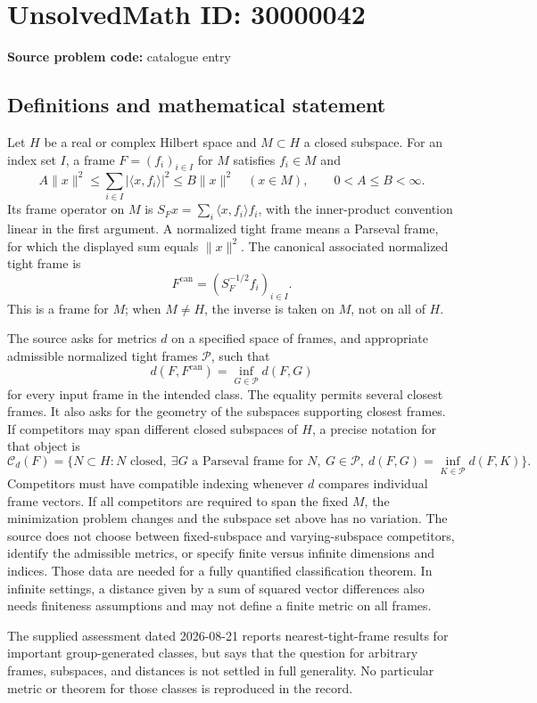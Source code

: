 \documentclass[11pt]{article}
\begin{document}
\section*{UnsolvedMath ID: 30000042}
\textbf{Source problem code:} catalogue entry
\subsection{Definitions and mathematical statement}
Let \(H\) be a real or complex Hilbert space and \(M\subset H\) a closed subspace. For an index set \(I\), a frame \(F=(f_i)_{i\in I}\) for \(M\) satisfies \(f_i\in M\) and
\[
A\|x\|^2\leq\sum_{i\in I}|\langle x,f_i\rangle|^2\leq B\|x\|^2
\quad(x\in M),\qquad 0<A\leq B<\infty.
\]
Its frame operator on \(M\) is \(S_Fx=\sum_i\langle x,f_i\rangle f_i\), with the inner-product convention linear in the first argument. A normalized tight frame means a Parseval frame, for which the displayed sum equals \(\|x\|^2\). The canonical associated normalized tight frame is
\[
F^{\mathrm{can}}=(S_F^{-1/2}f_i)_{i\in I}.
\]
This is a frame for \(M\); when \(M\ne H\), the inverse is taken on \(M\), not on all of \(H\).

The source asks for metrics \(d\) on a specified space of frames, and appropriate admissible normalized tight frames \(\mathcal P\), such that
\[
d(F,F^{\mathrm{can}})=\inf_{G\in\mathcal P}d(F,G)
\]
for every input frame in the intended class. The equality permits several closest frames. It also asks for the geometry of the subspaces supporting closest frames. If competitors may span different closed subspaces of \(H\), a precise notation for that object is
\[
\mathcal C_d(F)=\{N\subset H:N\text{ closed},\ \exists G\text{ a Parseval frame for }N,
\ G\in\mathcal P,\ d(F,G)=\inf_{K\in\mathcal P}d(F,K)\}.
\]
Competitors must have compatible indexing whenever \(d\) compares individual frame vectors. If all competitors are required to span the fixed \(M\), the minimization problem changes and the subspace set above has no variation. The source does not choose between fixed-subspace and varying-subspace competitors, identify the admissible metrics, or specify finite versus infinite dimensions and indices. Those data are needed for a fully quantified classification theorem. In infinite settings, a distance given by a sum of squared vector differences also needs finiteness assumptions and may not define a finite metric on all frames.

The supplied assessment dated 2026-08-21 reports nearest-tight-frame results for important group-generated classes, but says that the question for arbitrary frames, subspaces, and distances is not settled in full generality. No particular metric or theorem for those classes is reproduced in the record.
\end{document}

